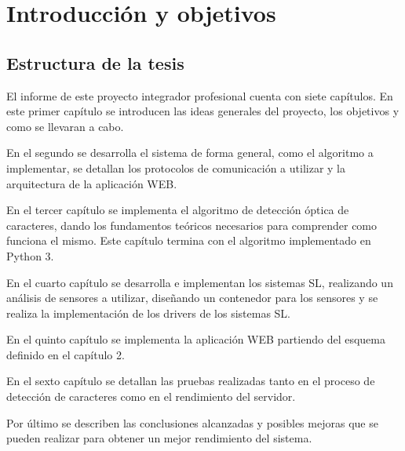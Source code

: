 \chapter{Introducción y objetivos}





\section{Estructura de la tesis}

El informe de este proyecto integrador profesional cuenta con siete capítulos. En este primer capítulo se introducen las ideas generales del proyecto, los objetivos y como se llevaran a cabo.

En el segundo se desarrolla el sistema de forma general, como el algoritmo a implementar, se detallan los protocolos de comunicación a utilizar y la arquitectura de la aplicación WEB.

En el tercer capítulo se implementa el algoritmo de detección óptica de caracteres, dando los fundamentos teóricos necesarios para comprender como funciona el mismo. Este capítulo termina con el algoritmo implementado en Python 3.

En el cuarto capítulo se desarrolla e implementan los sistemas SL, realizando un análisis de sensores a utilizar, diseñando un contenedor para los sensores y se realiza la implementación de los drivers de los sistemas SL.

En el quinto capítulo se implementa la aplicación WEB partiendo del esquema definido en el capítulo 2.

En el sexto capítulo se detallan las pruebas realizadas tanto en el proceso de detección de caracteres como en el rendimiento del servidor.

Por último se describen las conclusiones alcanzadas y posibles mejoras que se pueden realizar para obtener un mejor rendimiento del sistema.